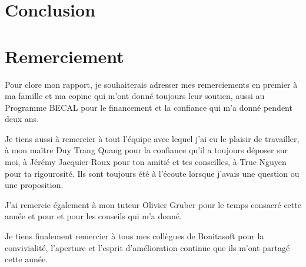 \section{Conclusion}


\section{Remerciement}
Pour clore mon rapport, je souhaiterais adresser mes remerciements en premier à ma famille et ma copine qui m'ont donné toujours leur soutien, aussi au Programme BECAL pour le financement et la confiance qui m'a donné pendent deux ans.

Je tiens aussi à remercier à tout l'équipe avec lequel j'ai eu le plaisir de travailler, à mon maître Duy Trang Quang pour la confiance qu'il a toujours déposer sur moi, à Jérémy Jacquier-Roux pour ton amitié et tes conseilles, à Truc Nguyen pour ta rigourosité. Ils sont toujours été à l'écoute lorsque j'avais une question ou une proposition.

J'ai remercie également à mon tuteur Olivier Gruber pour le temps consacré cette année et pour et pour les conseils qui m'a donné.

Je tiens finalement remercier à tous mes collègues de Bonitasoft pour la convivialité, l'aperture et l'esprit d'amélioration continue que ils m'ont partagé cette année.
